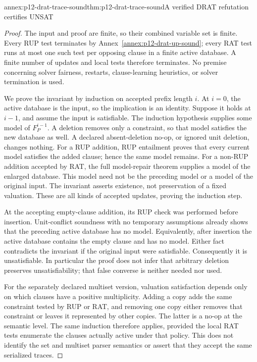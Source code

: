 \begin{annexitem}{annex:p12-drat-trace-sound}{thm:p12-drat-trace-sound}{A verified DRAT refutation certifies UNSAT}
\begin{proof}
The input and proof are finite, so their combined variable set is finite.
Every RUP test terminates by
Annex~\ref{annex:p12-drat-up-sound}; every RAT test runs at most one such
test per opposing clause in a finite active database.  A finite number of
updates and local tests therefore terminates.  No premise concerning solver
fairness, restarts, clause-learning heuristics, or solver termination is used.

We prove the invariant by induction on accepted prefix length \(i\).
At \(i=0\), the active database is the input, so the implication is an
identity.  Suppose it holds at \(i-1\), and assume the input is satisfiable.
The induction hypothesis supplies some model of \(F^{i-1}_P\).  A deletion
removes only a constraint, so that model satisfies the new database as well.
A declared absent-deletion no-op, or ignored unit deletion, changes nothing.
For a RUP addition, RUP entailment proves that every current model satisfies
the added clause; hence the same model remains.  For a non-RUP addition
accepted by RAT, the full model-repair theorem supplies a model of the
enlarged database.  This model need not be the preceding model or a model of
the original input.  The invariant asserts existence, not preservation of a
fixed valuation.  These are all kinds of accepted updates, proving the
induction step.

At the accepting empty-clause addition, its RUP check was performed before
insertion.  Unit-conflict soundness with no temporary assumptions already
shows that the preceding active database has no model.  Equivalently, after
insertion the active database contains the empty clause and has no model.
Either fact contradicts the invariant if the original input were
satisfiable.  Consequently it is unsatisfiable.  In particular the proof
does not infer that arbitrary deletion preserves unsatisfiability; that false
converse is neither needed nor used.

For the separately declared multiset version, valuation satisfaction depends
only on which clauses have a positive multiplicity.  Adding a copy adds the
same constraint tested by RUP or RAT, and removing one copy either removes
that constraint or leaves it represented by other copies.  The latter is a
no-op at the semantic level.  The same induction therefore applies, provided
the local RAT tests enumerate the clauses actually active under that policy.
This does not identify the set and multiset parser semantics or assert that
they accept the same serialized traces.
\end{proof}
\end{annexitem}

